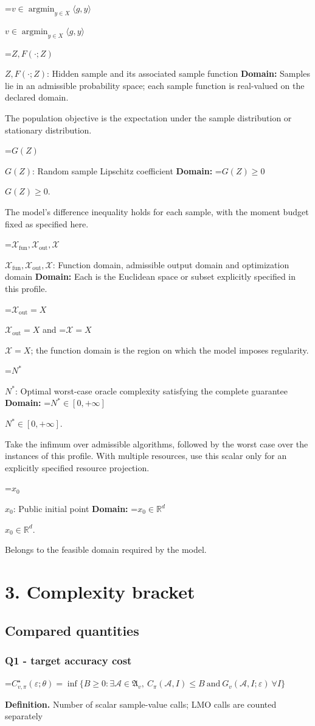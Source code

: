 \documentclass[10pt,a4paper]{article}
\newcommand{\AtlasMath}[1]{\par\begingroup\centering\setbox0=\hbox{$\displaystyle #1$}\ifdim\wd0>1.4\linewidth\typeout{ATLAS WIDE FORMULA: \the\wd0}\fi\ifdim\wd0>\linewidth\resizebox{\linewidth}{!}{\box0}\else\box0\fi\par\endgroup}
\newcommand{\AtlasInlineMath}[1]{\begingroup\setbox0=\hbox{$#1$}\ifdim\wd0>.4\linewidth\endgroup\AtlasMath{#1}\else\endgroup$#1$\fi}
\begin{document}
\AtlasInlineMath{v\in\operatorname{argmin}_{y\in X}\langle g,y\rangle}

\AtlasInlineMath{Z,F(\cdot;Z)}: Hidden sample and its associated sample function \textbf{Domain:} Samples lie in an admissible probability space; each sample function is real-valued on the declared domain.

The population objective is the expectation under the sample distribution or stationary distribution.

\AtlasInlineMath{G(Z)}: Random sample Lipschitz coefficient \textbf{Domain:} \AtlasInlineMath{G(Z)\ge0}.

The model's difference inequality holds for each sample, with the moment budget fixed as specified here.

\AtlasInlineMath{\mathcal{X}_{\mathrm{fun}},\mathcal{X}_{\mathrm{out}},\mathcal{X}}: Function domain, admissible output domain and optimization domain \textbf{Domain:} Each is the Euclidean space or subset explicitly specified in this profile.

\AtlasInlineMath{\mathcal{X}_{\mathrm{out}}=X} and \AtlasInlineMath{\mathcal{X}=X}; the function domain is the region on which the model imposes regularity.

\AtlasInlineMath{N^*}: Optimal worst-case oracle complexity satisfying the complete guarantee \textbf{Domain:} \AtlasInlineMath{N^*\in[0,+\infty]}.

Take the infimum over admissible algorithms, followed by the worst case over the instances of this profile. With multiple resources, use this scalar only for an explicitly specified resource projection.

\AtlasInlineMath{x_0}: Public initial point \textbf{Domain:} \AtlasInlineMath{x_0\in\mathbb{R}^d}.

Belongs to the feasible domain required by the model.

\section{3. Complexity bracket}
\subsection{Compared quantities}
\subsubsection{Q1 - target accuracy cost}
\AtlasMath{C^\star_{v,\pi}(\varepsilon;\theta)=\inf\{B\ge0:\exists\mathcal A\in\mathfrak A_v,\ C_\pi(\mathcal A,I)\le B\ \text{and}\ G_v(\mathcal A,I;\varepsilon)\ \forall I\}}
\textbf{Definition.} Number of scalar sample-value calls; LMO calls are counted separately
\end{document}
